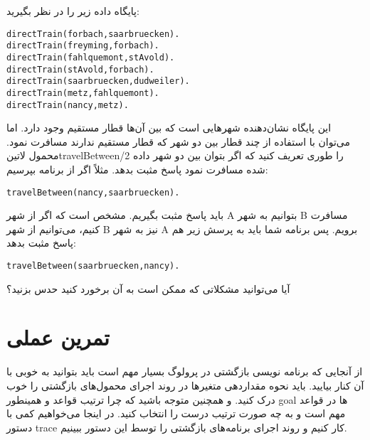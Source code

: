 \begin{exercise}
پایگاه داده زیر را در نظر بگیرید:

\begin{latin}
\begin{lstlisting}
directTrain(forbach,saarbruecken).
directTrain(freyming,forbach).
directTrain(fahlquemont,stAvold).
directTrain(stAvold,forbach).
directTrain(saarbruecken,dudweiler).
directTrain(metz,fahlquemont).
directTrain(nancy,metz).
\end{lstlisting}
\end{latin}

این پایگاه نشان‌دهنده شهرهایی است که بین آن‌ها قطار مستقیم وجود دارد. اما می‌توان با استفاده از چند قطار بین دو شهر که قطار مستقیم ندارند مسافرت نمود. محمول ‌لاتین{travelBetween/2} را طوری تعریف کنید که اگر بتوان بین دو شهر داده شده مسافرت نمود پاسخ مثبت بدهد. مثلاً اگر از برنامه بپرسیم:

\begin{latin}
\begin{lstlisting}
travelBetween(nancy,saarbruecken).
\end{lstlisting}
\end{latin}

باید پاسخ مثبت بگیریم. مشخص است که اگر از شهر A بتوانیم به شهر B مسافرت کنیم، می‌توانیم از شهر B نیز به شهر A برویم. پس برنامه شما باید به پرسش زیر هم پاسخ مثبت بدهد:

\begin{latin}
\begin{lstlisting}
travelBetween(saarbruecken,nancy).
\end{lstlisting}
\end{latin}

آیا می‌توانید مشکلاتی که ممکن است به آن برخورد کنید حدس بزنید؟
\end{exercise}

\section{تمرین عملی}
از آنجایی که برنامه نویسی بازگشتی در پرولوگ بسیار مهم است باید بتوانید به خوبی با آن کنار بیایید. باید نحوه مقداردهی متغیرها در روند اجرای محمول‌های بازگشتی را خوب درک کنید. و همچنین متوجه باشید که چرا ترتیب قواعد و همینطور goal ها در قواعد مهم است و به چه صورت ترتیب درست را انتخاب کنید. در اینجا می‌خواهیم کمی با دستور trace کار کنیم و روند اجرای برنامه‌های بازگشتی را توسط این دستور ببینیم.

